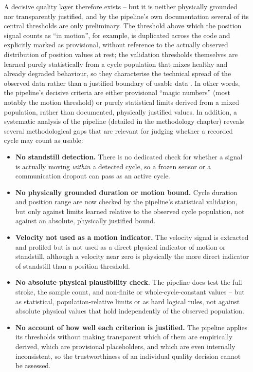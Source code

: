 A decisive quality layer therefore exists -- but it is neither physically grounded nor
transparently justified, and by the pipeline's own documentation several of its central
thresholds are only preliminary. The threshold above which the position signal counts as
``in motion'', for example, is duplicated across the code and explicitly marked as
provisional, without reference to the actually observed distribution of position values at
rest; the validation thresholds themselves are learned purely statistically from a cycle
population that mixes healthy and already degraded behaviour, so they characterise the
technical spread of the observed data rather than a justified boundary of usable
data \parencite{TODO-data-cleaning}. In other words, the pipeline's decisive criteria are
either provisional ``magic numbers'' (most notably the motion threshold) or purely
statistical limits derived from a mixed population, rather than documented, physically
justified values. In addition, a
systematic analysis of the pipeline (detailed in the methodology chapter) reveals several
methodological gaps that are relevant for judging whether a recorded cycle may count as
usable:

\begin{itemize}
  \item \textbf{No standstill detection.} There is no dedicated check for whether a
        signal is actually moving \emph{within} a detected cycle, so a frozen sensor or a
        communication dropout can pass as an active cycle.
  \item \textbf{No physically grounded duration or motion bound.} Cycle duration and
        position range are now checked by the pipeline's statistical validation, but only
        against limits learned relative to the observed cycle population, not against an
        absolute, physically justified bound.
  \item \textbf{Velocity not used as a motion indicator.} The velocity signal is extracted
        and profiled but is not used as a direct physical indicator of motion or
        standstill, although a velocity near zero is physically the more direct indicator
        of standstill than a position threshold.
  \item \textbf{No absolute physical plausibility check.} The pipeline does test the full
        stroke, the sample count, and non-finite or whole-cycle-constant values -- but as
        statistical, population-relative limits or as hard logical rules, not against
        absolute physical values that hold independently of the observed population.
  \item \textbf{No account of how well each criterion is justified.} The pipeline applies
        its thresholds without making transparent which of them are empirically derived,
        which are provisional placeholders, and which are even internally inconsistent, so
        the trustworthiness of an individual quality decision cannot be assessed.
\end{itemize}

